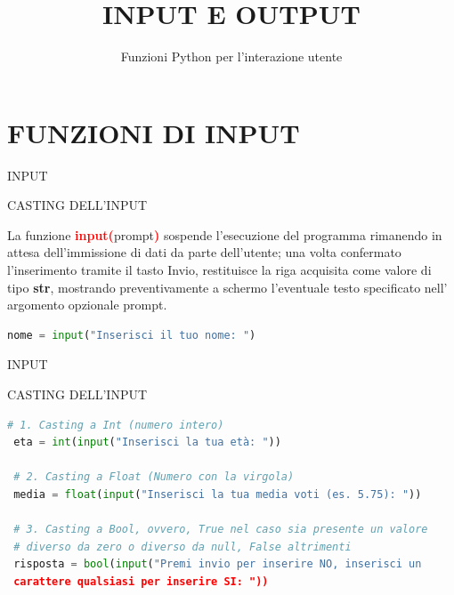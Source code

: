 \documentclass[aspectratio=1610]{beamer}
\title{INPUT E OUTPUT}
\subtitle{Funzioni Python per l'interazione utente}
\date{}
\institute{\textit{
        Fonti:
        \begin{itemize}
            \item[-] \href{https://docs.python.org/it/3/tutorial/inputoutput.html}{Documentazione Ufficiale Python}
            \item[-] \href{https://www.zanichelli.it/ricerca/prodotti/coding-python}{Coding con Python - Zanichelli}
        \end{itemize}
    }
}
\begin{document}
\begin{frame}
    \titlepage
\end{frame}

\section{FUNZIONI DI INPUT}

\begin{frame}[fragile]{INPUT}
    \begin{alertblock}{CASTING DELL'INPUT}
        \begin{minipage}{0.98\linewidth}
            \justifying
            La funzione \textcolor{red}{\textbf{input(}}prompt\textcolor{red}{\textbf{)}} 
            sospende l'esecuzione del programma rimanendo in attesa dell'immissione di 
            dati da parte dell'utente; una volta confermato l'inserimento tramite il 
            tasto Invio, restituisce la riga acquisita come valore di tipo \textbf{str}, 
            mostrando preventivamente a schermo l'eventuale testo specificato nell'
            argomento opzionale prompt.\\
            \bigskip
\begin{lstlisting}[language=Python]
 nome = input("Inserisci il tuo nome: ")
\end{lstlisting}
        \end{minipage}
    \end{alertblock}
\end{frame}

\begin{frame}[fragile]{INPUT}
    \begin{alertblock}{CASTING DELL'INPUT}
        \begin{minipage}{0.98\linewidth}
\begin{lstlisting}[language=Python]
 # 1. Casting a Int (numero intero)
 eta = int(input("Inserisci la tua età: "))

 # 2. Casting a Float (Numero con la virgola)
 media = float(input("Inserisci la tua media voti (es. 5.75): "))
 
 # 3. Casting a Bool, ovvero, True nel caso sia presente un valore 
 # diverso da zero o diverso da null, False altrimenti
 risposta = bool(input("Premi invio per inserire NO, inserisci un 
 carattere qualsiasi per inserire SI: "))
\end{lstlisting}
        \end{minipage}
    \end{alertblock}
\end{frame}
\end{document}
